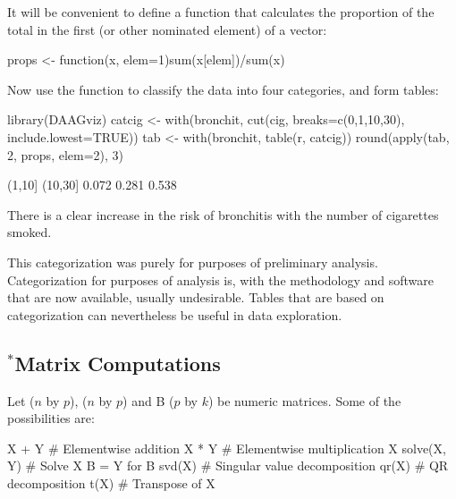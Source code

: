 It will be convenient to define a function  that
calculates the proportion of the total in the first (or other nominated
element) of a vector:
\begin{Schunk}
\begin{Sinput}
props <- function(x, elem=1)sum(x[elem])/sum(x)
\end{Sinput}
\end{Schunk}
Now use the function  to classify the data into four
  categories, and form tables:
\begin{Schunk}
\begin{Sinput}
library(DAAGviz)
catcig <- with(bronchit,
               cut(cig, breaks=c(0,1,10,30),
                   include.lowest=TRUE))
tab <- with(bronchit, table(r, catcig))
round(apply(tab, 2, props, elem=2), 3)
\end{Sinput}
\begin{Soutput}
  [0,1]  (1,10] (10,30] 
  0.072   0.281   0.538 
\end{Soutput}
\end{Schunk}
\noindent
There is a clear increase in the risk of bronchitis with the number
of cigarettes smoked.

This categorization was purely for  purposes of
preliminary analysis.  Categorization for purposes of analysis is,
with the methodology and software that are now available, usually
undesirable. Tables that are based on categorization can nevertheless
be useful in data exploration.

\subsection{$^*$Matrix Computations}
Let  ($n$ by $p$),  ($n$ by $p$) and B ($p$ by $k$) be
numeric matrices. Some of the possibilities are:
\begin{Schunk}
\begin{Sinput}
X + Y             # Elementwise addition
X * Y             # Elementwise multiplication
X %*% B           # Matrix multiplication
solve(X, Y)       # Solve X B = Y for B
svd(X)            # Singular value decomposition
qr(X)             # QR decomposition
t(X)              # Transpose of X
\end{Sinput}
\end{Schunk}

